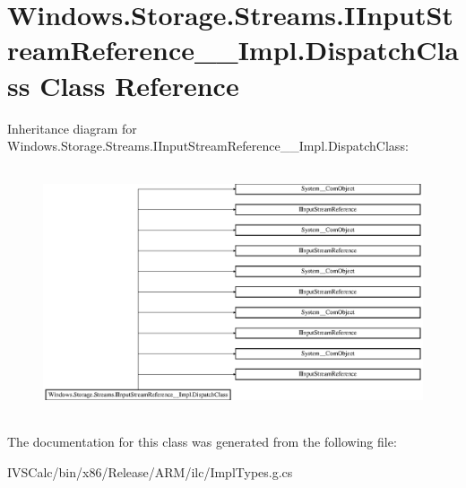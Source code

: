 \hypertarget{class_windows_1_1_storage_1_1_streams_1_1_i_input_stream_reference_____impl_1_1_dispatch_class}{}\section{Windows.\+Storage.\+Streams.\+I\+Input\+Stream\+Reference\+\_\+\+\_\+\+Impl.\+Dispatch\+Class Class Reference}
\label{class_windows_1_1_storage_1_1_streams_1_1_i_input_stream_reference_____impl_1_1_dispatch_class}
Inheritance diagram for Windows.\+Storage.\+Streams.\+I\+Input\+Stream\+Reference\+\_\+\+\_\+\+Impl.\+Dispatch\+Class\+:\begin{figure}[H]
\begin{center}
\leavevmode
\includegraphics[height=7.350835cm]{class_windows_1_1_storage_1_1_streams_1_1_i_input_stream_reference_____impl_1_1_dispatch_class}
\end{center}
\end{figure}


The documentation for this class was generated from the following file\+:\begin{DoxyCompactItemize}
\item 
I\+V\+S\+Calc/bin/x86/\+Release/\+A\+R\+M/ilc/Impl\+Types.\+g.\+cs\end{DoxyCompactItemize}
